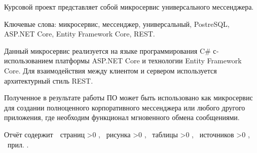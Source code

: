 \Referat

\hfill

Курсовой проект представляет собой микросервис уни­версального мессенджера.

Ключевые слова: микросервис, мессенджер, универсальный, PostreSQL, ASP.NET Core, Entity Framework Core, REST. 

Данный микросервис реализуется на языке программирования C$\#$  с­ использованием платформы ASP.NET Core и технологии Entity Framework Core. Для взаимодействия между клиентом и сервером используется архитектурный стиль REST.

Полученное в результате работы ПО может быть использовано как микросервис для создании полноценного корпоративного мессенджера или любого другого приложения, где необходим функционал мгновенного обмена сообщениями. 

Отчёт содержит \pageref{LastPage}\,~страниц%
    \ifnum \totfig >0
    , \totfig~рисунка%
    \fi
    \ifnum \tottab >0
    , \tottab~таблицы%
    \fi
    \ifnum \totbib >0
    , \totbib~источников%
    \fi
    \ifnum \totapp >0
    , \totapp~прил.%
    \else
    .%
    \fi

